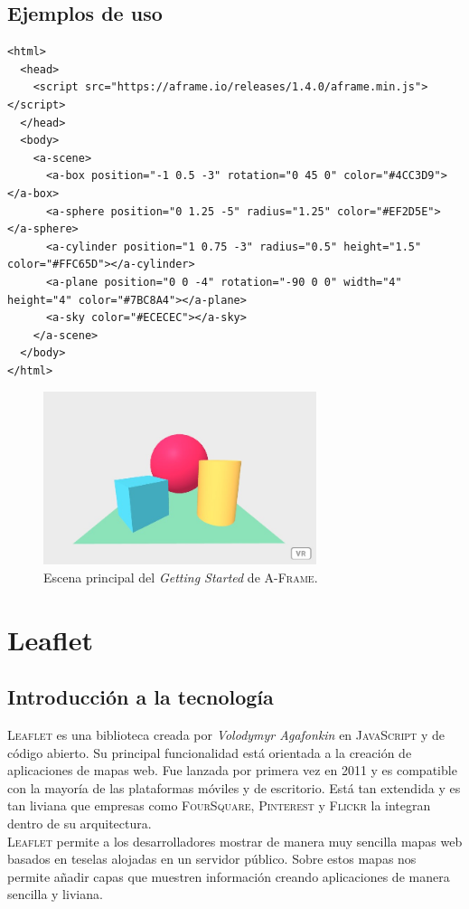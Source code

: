 \documentclass[a4paper, 11pt]{book}
\begin{document}
\subsection{Ejemplos de uso}
\begin{verbatim}
<html>
  <head>
    <script src="https://aframe.io/releases/1.4.0/aframe.min.js"></script>
  </head>
  <body>
    <a-scene>
      <a-box position="-1 0.5 -3" rotation="0 45 0" color="#4CC3D9"></a-box>
      <a-sphere position="0 1.25 -5" radius="1.25" color="#EF2D5E"></a-sphere>
      <a-cylinder position="1 0.75 -3" radius="0.5" height="1.5" color="#FFC65D"></a-cylinder>
      <a-plane position="0 0 -4" rotation="-90 0 0" width="4" height="4" color="#7BC8A4"></a-plane>
      <a-sky color="#ECECEC"></a-sky>
    </a-scene>
  </body>
</html>
\end{verbatim}
\begin{figure}[h]
  \centering
  \includegraphics[width=8cm, keepaspectratio]{img/gettingstarted_Aframe.jpg}
  \caption{Escena principal del \emph{Getting Started} de \textsc{A-Frame}.}
  \label{fig:AFrameGettingStarted}
\end{figure}
\section{Leaflet}
\label{sec:leaflet}
\subsection{Introducción a la tecnología}
\textsc{Leaflet} es una biblioteca creada por \emph{Volodymyr Agafonkin} en \textsc{JavaScript} y de código abierto.
Su principal funcionalidad está orientada a la creación de aplicaciones de mapas web. Fue lanzada por primera vez en 2011 y es compatible con la mayoría de las plataformas móviles y de escritorio.
Está tan extendida y es tan liviana que empresas como \textsc{FourSquare}, \textsc{Pinterest} y \textsc{Flickr} la integran dentro de su arquitectura.\\
\textsc{Leaflet} permite a los desarrolladores mostrar de manera muy sencilla mapas web basados en teselas alojadas en un servidor público. Sobre estos mapas nos permite añadir capas que muestren información creando aplicaciones de manera sencilla y liviana.
\end{document}
